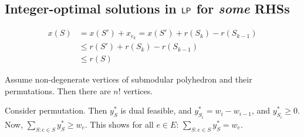 \subsection{Integer-optimal solutions in $\mathsf{LP}$ for \emph{some} RHSs}
\begin{align*}
    x(S) &= x(S') + x_{e_k}=x(S')+r(S_k)-r(S_{k-1})\\
    &\leq r(S')+ r(S_k) - r(S_{k-1})\\
    &\leq r(S)
\end{align*}
\begin{note}
    Assume non-degenerate vertices of submodular polyhedron and their permutations. Then there are $n!$ vertices.
\end{note}
Consider permutation. Then $y^*_S$ is dual feasible,  and $y_{S_i}^*=w_i - w_{i-1}$, and $y^*_{S_i} \geq 0$.
Now, $\sum_{S:e\in S} y_S^* \geq w_e$.
This shows for all $e \in E$: $\sum_{S: e \in S} y_S^* = w_e$.

